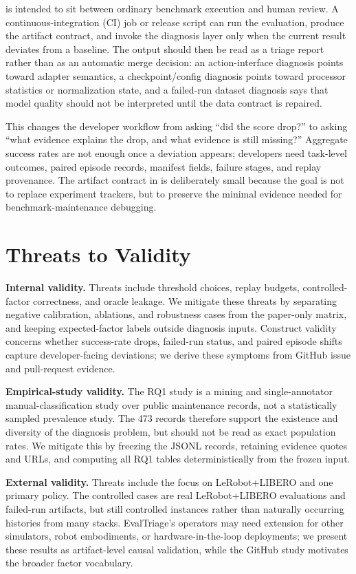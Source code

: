 \sys is intended to sit between ordinary benchmark execution and human review. A continuous-integration (CI) job or release script can run the evaluation, produce the artifact contract, and invoke the diagnosis layer only when the current result deviates from a baseline. The output should then be read as a triage report rather than as an automatic merge decision: an action-interface diagnosis points toward adapter semantics, a checkpoint/config diagnosis points toward processor statistics or normalization state, and a failed-run dataset diagnosis says that model quality should not be interpreted until the data contract is repaired.

This changes the developer workflow from asking ``did the score drop?'' to asking ``what evidence explains the drop, and what evidence is still missing?'' Aggregate success rates are not enough once a deviation appears; developers need task-level outcomes, paired episode records, manifest fields, failure stages, and replay provenance. The artifact contract in \sys is deliberately small because the goal is not to replace experiment trackers, but to preserve the minimal evidence needed for benchmark-maintenance debugging.

\section{Threats to Validity}

\noindent\textbf{Internal validity.} Threats include threshold choices, replay budgets, controlled-factor correctness, and oracle leakage. We mitigate these threats by separating negative calibration, ablations, and robustness cases from the paper-only matrix, and keeping expected-factor labels outside diagnosis inputs. Construct validity concerns whether success-rate drops, failed-run status, and paired episode shifts capture developer-facing deviations; we derive these symptoms from GitHub issue and pull-request evidence.

\noindent\textbf{Empirical-study validity.} The RQ1 study is a mining and single-annotator manual-classification study over public maintenance records, not a statistically sampled prevalence study. The 473 records therefore support the existence and diversity of the diagnosis problem, but should not be read as exact population rates. We mitigate this by freezing the JSONL records, retaining evidence quotes and URLs, and computing all RQ1 tables deterministically from the frozen input.

\noindent\textbf{External validity.} Threats include the focus on LeRobot+LIBERO and one primary policy. The controlled cases are real LeRobot+LIBERO evaluations and failed-run artifacts, but still controlled instances rather than naturally occurring histories from many stacks. EvalTriage's operators may need extension for other simulators, robot embodiments, or hardware-in-the-loop deployments; we present these results as artifact-level causal validation, while the GitHub study motivates the broader factor vocabulary.

